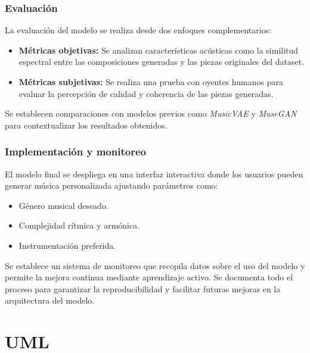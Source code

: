 \subsubsection{Evaluación}

La evaluación del modelo se realiza desde dos enfoques complementarios:
\begin{itemize}
    \item \textbf{Métricas objetivas:} Se analizan características acústicas como la similitud espectral entre las composiciones generadas y las piezas originales del dataset.
    \item \textbf{Métricas subjetivas:} Se realiza una prueba con oyentes humanos para evaluar la percepción de calidad y coherencia de las piezas generadas.
\end{itemize}

Se establecen comparaciones con modelos previos como \textit{MusicVAE} y \textit{MuseGAN} para contextualizar los resultados obtenidos.

\subsubsection{Implementación y monitoreo}

El modelo final se despliega en una interfaz interactiva donde los usuarios pueden generar música personalizada ajustando parámetros como:
\begin{itemize}
    \item Género musical deseado.
    \item Complejidad rítmica y armónica.
    \item Instrumentación preferida.
\end{itemize}

Se establece un sistema de monitoreo que recopila datos sobre el uso del modelo y permite la mejora continua mediante aprendizaje activo. Se documenta todo el proceso para garantizar la reproducibilidad y facilitar futuras mejoras en la arquitectura del modelo.

\section{UML}








